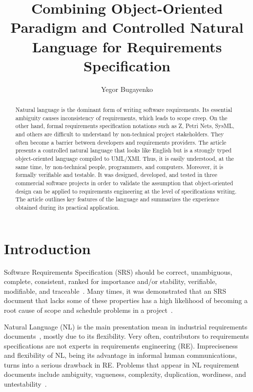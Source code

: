 \documentclass[sigplan,10pt,nonacm=true]{acmart}
\newcommand{\nospell}[1]{#1}
\begin{document}
\title{Combining Object-Oriented Paradigm and Controlled Natural Language for Requirements Specification}
\author{Yegor Bugayenko}{}{}

\begin{abstract} Natural language is the dominant form of writing software requirements.
Its essential ambiguity causes inconsistency of requirements,
which leads to scope creep. On the other hand, formal requirements
specification notations such as Z, \nospell{Petri Nets}, SysML, and others are
difficult to understand by non-technical project stakeholders. They often
become a barrier between developers and requirements providers. The article
presents a controlled natural language that looks like English but
is a strongly typed object-oriented language compiled to
UML/XMI. Thus, it is easily understood, at the same time, by non-technical
people, programmers, and computers. Moreover, it is formally verifiable and
testable. It was designed, developed, and tested in three commercial
software projects in order to validate the assumption that object-oriented
design can be applied to requirements engineering at the level of
specifications writing. The article outlines key features of the language and summarizes
the experience obtained during its practical application. \end{abstract}
\maketitle

\section{Introduction}
\label{sec:intro}

Software Requirements Specification (SRS) should be correct, unambiguous,
complete, consistent, ranked for importance and/or stability, verifiable,
modifiable, and traceable~\citep{ieee830}. Many times, it was demonstrated that an SRS
document that lacks some of these properties has a high likelihood of
becoming a root cause of scope and schedule problems in a
project~\citep{wiegers03,ears09,chen09}.

Natural Language (NL) is the main presentation mean in industrial
requirements documents~\citep{kof10,sinha10}, mostly due to its flexibility.
Very often, contributors to requirements specifications are not experts in
requirements engineering (RE). Impreciseness and flexibility of NL, being
its advantage in informal human communications, turns into a serious drawback
in RE. Problems that appear in NL requirement documents include
ambiguity, vagueness, complexity, duplication, wordiness, and
\nospell{untestability}~\citep{ears09}.
\end{document}
